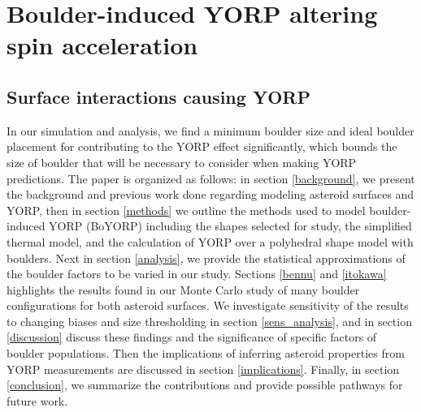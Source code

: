 \chapter{Boulder-induced YORP altering spin acceleration}
\label{yorp_spin}

\section{Surface interactions causing YORP}\label{formulation}
In our simulation and analysis, we find a minimum boulder size and ideal boulder placement for contributing to the YORP effect significantly, which bounds the size of boulder that will be necessary to consider when making YORP predictions. The paper is organized as follows: in section \ref{background}, we present the background and previous work done regarding modeling asteroid surfaces and YORP, then in section \ref{methods} we outline the methods used to model boulder-induced YORP (BoYORP) including the shapes selected for study,  the simplified thermal model, and the calculation of YORP over a polyhedral shape model with boulders. Next in section \ref{analysis}, we provide the statistical approximations of the boulder factors to be varied in our study. Sections \ref{bennu} and \ref{itokawa} highlights the results found in our Monte Carlo study of many boulder configurations for both asteroid surfaces. We investigate sensitivity of the results to changing biases and size thresholding in section \ref{sens_analysis}, and in section \ref{discussion} discuss these findings and the significance of specific factors of boulder populations. Then the implications of inferring asteroid properties from YORP measurements are discussed in section \ref{implications}. Finally, in section \ref{conclusion}, we summarize the contributions and provide possible pathways for future work. 


